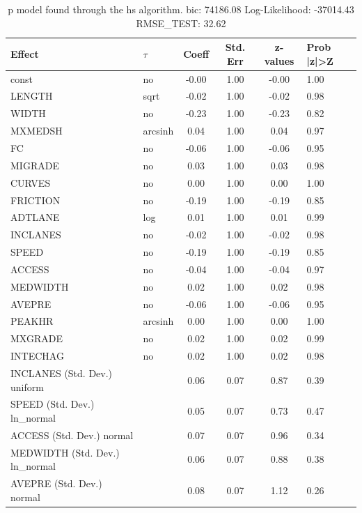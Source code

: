\begin{table}
	\caption{p model found through the hs algorithm. bic: 74186.08 Log-Likelihood: -37014.43 RMSE_TEST: 32.62}
	\begin{center}
		\begin{tabular}{|l|l|c|c|c|l|}
			\hline
			Effect & $\tau$ & Coeff & Std. Err & z-values & Prob |z|>Z \\
			\hline
			const & no & -0.00 & 1.00 & -0.00 & 1.00 \\
			\hline
			LENGTH & sqrt & -0.02 & 1.00 & -0.02 & 0.98 \\
			\hline
			WIDTH & no & -0.23 & 1.00 & -0.23 & 0.82 \\
			\hline
			MXMEDSH & arcsinh & 0.04 & 1.00 & 0.04 & 0.97 \\
			\hline
			FC & no & -0.06 & 1.00 & -0.06 & 0.95 \\
			\hline
			MIGRADE & no & 0.03 & 1.00 & 0.03 & 0.98 \\
			\hline
			CURVES & no & 0.00 & 1.00 & 0.00 & 1.00 \\
			\hline
			FRICTION & no & -0.19 & 1.00 & -0.19 & 0.85 \\
			\hline
			ADTLANE & log & 0.01 & 1.00 & 0.01 & 0.99 \\
			\hline
			INCLANES & no & -0.02 & 1.00 & -0.02 & 0.98 \\
			\hline
			SPEED & no & -0.19 & 1.00 & -0.19 & 0.85 \\
			\hline
			ACCESS & no & -0.04 & 1.00 & -0.04 & 0.97 \\
			\hline
			MEDWIDTH & no & 0.02 & 1.00 & 0.02 & 0.98 \\
			\hline
			AVEPRE & no & -0.06 & 1.00 & -0.06 & 0.95 \\
			\hline
			PEAKHR & arcsinh & 0.00 & 1.00 & 0.00 & 1.00 \\
			\hline
			MXGRADE & no & 0.02 & 1.00 & 0.02 & 0.99 \\
			\hline
			INTECHAG & no & 0.02 & 1.00 & 0.02 & 0.98 \\
			\hline
			INCLANES (Std. Dev.) uniform &  & 0.06 & 0.07 & 0.87 & 0.39 \\
			\hline
			SPEED (Std. Dev.) ln_normal &  & 0.05 & 0.07 & 0.73 & 0.47 \\
			\hline
			ACCESS (Std. Dev.) normal &  & 0.07 & 0.07 & 0.96 & 0.34 \\
			\hline
			MEDWIDTH (Std. Dev.) ln_normal &  & 0.06 & 0.07 & 0.88 & 0.38 \\
			\hline
			AVEPRE (Std. Dev.) normal &  & 0.08 & 0.07 & 1.12 & 0.26 \\

\end{tabular}
\end{center}
\end{table}
